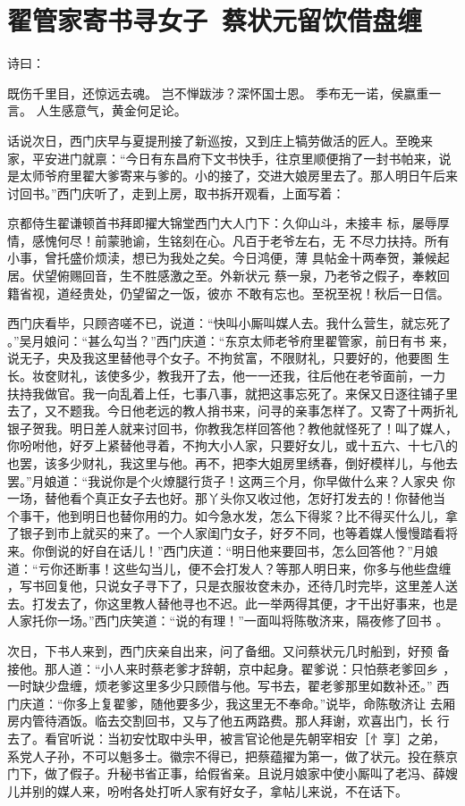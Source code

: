 \chapter{翟管家寄书寻女子~蔡状元留饮借盘缠}

诗曰：

既伤千里目，还惊远去魂。
岂不惮跋涉？深怀国士恩。
季布无一诺，侯嬴重一言。
人生感意气，黄金何足论。

话说次日，西门庆早与夏提刑接了新巡按，又到庄上犒劳做活的匠人。至晚来
家，平安进门就禀：“今日有东昌府下文书快手，往京里顺便捎了一封书帕来，说
是太师爷府里翟大爹寄来与爹的。小的接了，交进大娘房里去了。那人明日午后来
讨回书。”西门庆听了，走到上房，取书拆开观看，上面写着：

京都侍生翟谦顿首书拜即擢大锦堂西门大人门下：久仰山斗，未接丰
标，屡辱厚情，感愧何尽！前蒙驰谕，生铭刻在心。凡百于老爷左右，无
不尽力扶持。所有小事，曾托盛价烦渎，想已为我处之矣。今日鸿便，薄
具帖金十两奉贺，兼候起居。伏望俯赐回音，生不胜感激之至。外新状元
蔡一泉，乃老爷之假子，奉敕回籍省视，道经贵处，仍望留之一饭，彼亦
不敢有忘也。至祝至祝！秋后一日信。

西门庆看毕，只顾咨嗟不已，说道：“快叫小厮叫媒人去。我什么营生，就忘死了
。”吴月娘问：“甚么勾当？”西门庆道：“东京太师老爷府里翟管家，前日有书
来，说无子，央及我这里替他寻个女子。不拘贫富，不限财礼，只要好的，他要图
生长。妆奁财礼，该使多少，教我开了去，他一一还我，往后他在老爷面前，一力
扶持我做官。我一向乱着上任，七事八事，就把这事忘死了。来保又日逐往铺子里
去了，又不题我。今日他老远的教人捎书来，问寻的亲事怎样了。又寄了十两折礼
银子贺我。明日差人就来讨回书，你教我怎样回答他？教他就怪死了！叫了媒人，
你吩咐他，好歹上紧替他寻着，不拘大小人家，只要好女儿，或十五六、十七八的
也罢，该多少财礼，我这里与他。再不，把李大姐房里绣春，倒好模样儿，与他去
罢。”月娘道：“我说你是个火燎腿行货子！这两三个月，你早做什么来？人家央
你一场，替他看个真正女子去也好。那丫头你又收过他，怎好打发去的！你替他当
个事干，他到明日也替你用的力。如今急水发，怎么下得浆？比不得买什么儿，拿
了银子到市上就买的来了。一个人家闺门女子，好歹不同，也等着媒人慢慢踏看将
来。你倒说的好自在话儿！”西门庆道：“明日他来要回书，怎么回答他？”月娘
道：“亏你还断事！这些勾当儿，便不会打发人？等那人明日来，你多与他些盘缠
，写书回复他，只说女子寻下了，只是衣服妆奁未办，还待几时完毕，这里差人送
去。打发去了，你这里教人替他寻也不迟。此一举两得其便，才干出好事来，也是
人家托你一场。”西门庆笑道：“说的有理！”一面叫将陈敬济来，隔夜修了回书
。

次日，下书人来到，西门庆亲自出来，问了备细。又问蔡状元几时船到，好预
备接他。那人道：“小人来时蔡老爹才辞朝，京中起身。翟爹说：只怕蔡老爹回乡
，一时缺少盘缠，烦老爹这里多少只顾借与他。写书去，翟老爹那里如数补还。”
西门庆道：“你多上复翟爹，随他要多少，我这里无不奉命。”说毕，命陈敬济让
去厢房内管待酒饭。临去交割回书，又与了他五两路费。那人拜谢，欢喜出门，长
行去了。看官听说：当初安忱取中头甲，被言官论他是先朝宰相安［忄享］之弟，
系党人子孙，不可以魁多士。徽宗不得已，把蔡蕴擢为第一，做了状元。投在蔡京
门下，做了假子。升秘书省正事，给假省亲。且说月娘家中使小厮叫了老冯、薛嫂
儿并别的媒人来，吩咐各处打听人家有好女子，拿帖儿来说，不在话下。

